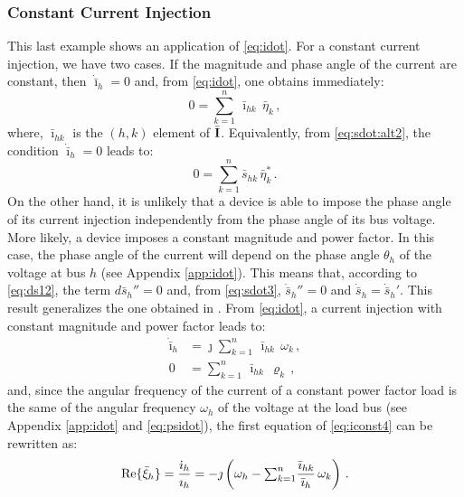 \documentclass[journal, twocolumn, letter]{IEEEtran}
\newcommand{\bfb}[1]{\boldsymbol{\rm #1}}
\renewcommand{\Re}{{\rm Re}}
\newcommand{\shdot}{\dot{\bar{s}}_h}
\newcommand{\etak}{\bar{\eta}_k}
\newcommand{\rhok}{\varrho_k}
\newcommand{\sh}{\bar{s}_h}
\newcommand{\shk}{\bar{s}_{hk}}
\newcommand{\khk}{\bar{\ii}_{hk}}
\renewcommand{\th}{\theta_h}
\newcommand{\wh}{\omega_h}
\newcommand{\wk}{\omega_k}
\newcommand{\sk}{{\textstyle \sum}_{k=1}^{n}}
\newcommand{\ii}{\imath}
\newcommand{\jj}{\jmath}
\newcommand{\ih}{\bar{\ii}_{h}}
\newcommand{\ihdot}{\dot{\bar{\ii}}_{h}}
\newcommand{\xih}{\bar{\xi}_h}
\newcommand{\Ibus}{\bar{\bfb I}}
\begin{document}
\subsubsection{Constant Current Injection}

This last example shows an application of \eqref{eq:idot}.  For a
constant current injection, we have two cases.  If the magnitude and
phase angle of the current are constant, then $\ihdot = 0$ and, from
\eqref{eq:idot}, one obtains immediately:
\begin{equation}
  \label{eq:iconst1}
  0 = \sk \, \khk \, \etak \, ,
\end{equation}
where, $\khk$ is the $(h,k)$ element of $\Ibus$.  Equivalently, from
\eqref{eq:sdot:alt2}, the condition $\ihdot = 0$ leads to:
\begin{equation}
  \label{eq:iconst2}
  0 = \sk \shk \, \etak^* \, .
\end{equation}
On the other hand, it is unlikely that a device is able to impose the
phase angle of its current injection independently from the phase
angle of its bus voltage.  More likely, a device imposes a constant
magnitude and power factor.  In this case, the phase angle of the
current will depend on the phase angle $\th$ of the voltage at bus $h$
 (see Appendix \ref{app:idot}).  This means that,
according to \eqref{eq:ds12}, the term $d \sh''=0$ and, from
\eqref{eq:sdot3}, $\shdot'' = 0$ and $\shdot = \shdot'$.
 This result generalizes the one obtained in
\cite{Freqload}.  From \eqref{eq:idot},
a current injection with constant magnitude and power factor leads to:
\begin{equation}
  \label{eq:iconst4}
  \begin{aligned}
    \ihdot &= \jj \sk \, \khk \, \wk \, , \\
    0 &= \sk \, \khk \, \rhok \, ,
  \end{aligned}
\end{equation}
and,  since the angular frequency of the current of a
constant power factor load is the same of the angular frequency $\wh$
of the voltage at the load bus (see Appendix \ref{app:idot} and
\eqref{eq:psidot}),  the first equation of
\eqref{eq:iconst4} can be rewritten as:
\begin{equation}
  \label{eq:iconst5}
  \begin{aligned}
    \Re \{ \xih \} =
    \frac{\dot{\ii}_h}{\ii_h} =
    -\jj \left ( \wh - \sk \frac{\khk}{\ih} \, \wk \right ) \, .
  \end{aligned}
\end{equation}
\end{document}
